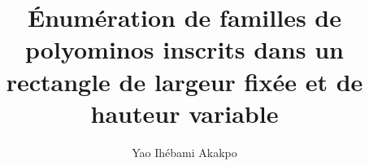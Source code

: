 \documentclass[12pt]{memoireuqam1.3}
\begin{document}
\title{Énumération de familles de polyominos inscrits dans un rectangle de largeur fixée et de hauteur variable}
\author{Yao Ihébami Akakpo}
\uqammemoire %
{}
\thispagestyle{empty}        %
\maketitle
\renewcommand \bibname{R\'EF\'ERENCES}%
\renewcommand \listfigurename{LISTE DES FIGURES}
\renewcommand \appendixname{APPENDICE}
\renewcommand \figurename{Figure}
\renewcommand \tablename{Tableau}
\addtocounter{page}{1} %

\tableofcontents %
\listoftables %
\listoffigures %



%









%

%

\end{document}
